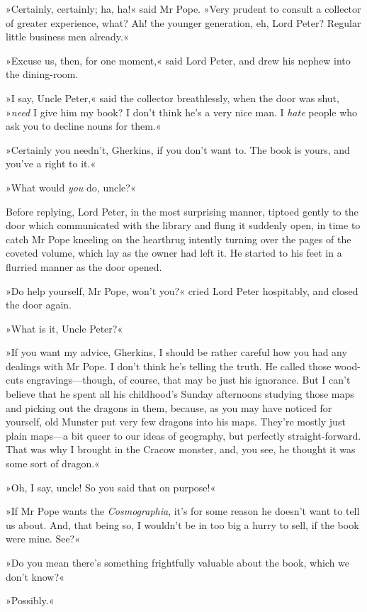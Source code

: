 »Certainly, certainly; ha, ha!« said Mr Pope. »Very prudent to consult a collector of greater experience, what? Ah! the younger generation, eh, Lord Peter? Regular little business men already.«

»Excuse us, then, for one moment,« said Lord Peter, and drew his nephew into the dining-room.

»I say, Uncle Peter,« said the collector breathlessly, when the door was shut, »\textit{need} I give him my book? I don't think he's a very nice man. I \textit{hate} people who ask you to decline nouns for them.«

»Certainly you needn't, Gherkins, if you don't want to. The book is yours, and you've a right to it.«

»What would \textit{you} do, uncle?«

Before replying, Lord Peter, in the most surprising manner, tiptoed gently to the door which communicated with the library and flung it suddenly open, in time to catch Mr Pope kneeling on the hearthrug intently turning over the pages of the coveted volume, which lay as the owner had left it. He started to his feet in a flurried manner as the door opened.

»Do help yourself, Mr Pope, won't you?« cried Lord Peter hospitably, and closed the door again.

»What is it, Uncle Peter?«

»If you want my advice, Gherkins, I should be rather careful how you had any dealings with Mr Pope. I don't think he's telling the truth. He called those wood-cuts engravings—though, of course, that may be just his ignorance. But I can't believe that he spent all his childhood's Sunday afternoons studying those maps and picking out the dragons in them, because, as you may have noticed for yourself, old Munster put very few dragons into his maps. They're mostly just plain maps—a bit queer to our ideas of geography, but perfectly straight-forward. That was why I brought in the Cracow monster, and, you see, he thought it was some sort of dragon.«

»Oh, I say, uncle! So you said that on purpose!«

»If Mr Pope wants the \textit{Cosmographia}, it's for some reason he doesn't want to tell us about. And, that being so, I wouldn't be in too big a hurry to sell, if the book were mine. See?«

»Do you mean there's something frightfully valuable about the book, which we don't know?«

»Possibly.«

